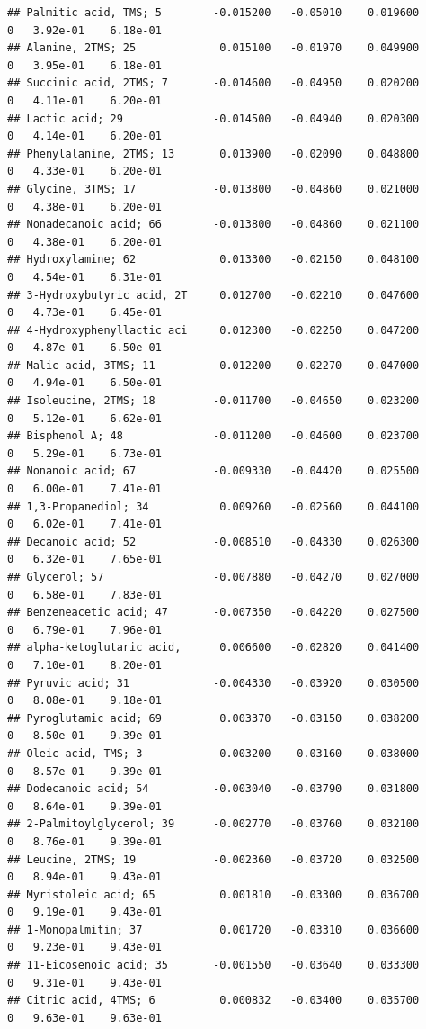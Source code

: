 \documentclass[]{article}
\begin{document}
\begin{verbatim}
## Palmitic acid, TMS; 5        -0.015200   -0.05010    0.019600         0   3.92e-01    6.18e-01
## Alanine, 2TMS; 25             0.015100   -0.01970    0.049900         0   3.95e-01    6.18e-01
## Succinic acid, 2TMS; 7       -0.014600   -0.04950    0.020200         0   4.11e-01    6.20e-01
## Lactic acid; 29              -0.014500   -0.04940    0.020300         0   4.14e-01    6.20e-01
## Phenylalanine, 2TMS; 13       0.013900   -0.02090    0.048800         0   4.33e-01    6.20e-01
## Glycine, 3TMS; 17            -0.013800   -0.04860    0.021000         0   4.38e-01    6.20e-01
## Nonadecanoic acid; 66        -0.013800   -0.04860    0.021100         0   4.38e-01    6.20e-01
## Hydroxylamine; 62             0.013300   -0.02150    0.048100         0   4.54e-01    6.31e-01
## 3-Hydroxybutyric acid, 2T     0.012700   -0.02210    0.047600         0   4.73e-01    6.45e-01
## 4-Hydroxyphenyllactic aci     0.012300   -0.02250    0.047200         0   4.87e-01    6.50e-01
## Malic acid, 3TMS; 11          0.012200   -0.02270    0.047000         0   4.94e-01    6.50e-01
## Isoleucine, 2TMS; 18         -0.011700   -0.04650    0.023200         0   5.12e-01    6.62e-01
## Bisphenol A; 48              -0.011200   -0.04600    0.023700         0   5.29e-01    6.73e-01
## Nonanoic acid; 67            -0.009330   -0.04420    0.025500         0   6.00e-01    7.41e-01
## 1,3-Propanediol; 34           0.009260   -0.02560    0.044100         0   6.02e-01    7.41e-01
## Decanoic acid; 52            -0.008510   -0.04330    0.026300         0   6.32e-01    7.65e-01
## Glycerol; 57                 -0.007880   -0.04270    0.027000         0   6.58e-01    7.83e-01
## Benzeneacetic acid; 47       -0.007350   -0.04220    0.027500         0   6.79e-01    7.96e-01
## alpha-ketoglutaric acid,      0.006600   -0.02820    0.041400         0   7.10e-01    8.20e-01
## Pyruvic acid; 31             -0.004330   -0.03920    0.030500         0   8.08e-01    9.18e-01
## Pyroglutamic acid; 69         0.003370   -0.03150    0.038200         0   8.50e-01    9.39e-01
## Oleic acid, TMS; 3            0.003200   -0.03160    0.038000         0   8.57e-01    9.39e-01
## Dodecanoic acid; 54          -0.003040   -0.03790    0.031800         0   8.64e-01    9.39e-01
## 2-Palmitoylglycerol; 39      -0.002770   -0.03760    0.032100         0   8.76e-01    9.39e-01
## Leucine, 2TMS; 19            -0.002360   -0.03720    0.032500         0   8.94e-01    9.43e-01
## Myristoleic acid; 65          0.001810   -0.03300    0.036700         0   9.19e-01    9.43e-01
## 1-Monopalmitin; 37            0.001720   -0.03310    0.036600         0   9.23e-01    9.43e-01
## 11-Eicosenoic acid; 35       -0.001550   -0.03640    0.033300         0   9.31e-01    9.43e-01
## Citric acid, 4TMS; 6          0.000832   -0.03400    0.035700         0   9.63e-01    9.63e-01
\end{verbatim}
\end{document}

